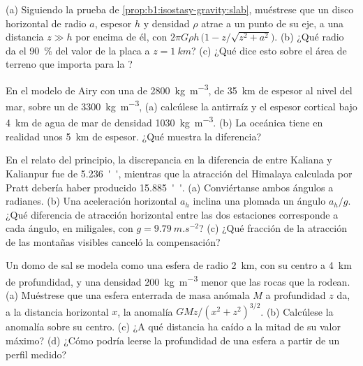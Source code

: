 \begin{exercise}[$\star\star$]\label{exo:b1:isostasy-gravity:7}
(a) Siguiendo la prueba de \cref{prop:b1:isostasy-gravity:slab}, muéstrese que un disco horizontal de radio $a$, espesor $h$ y
densidad $\rho$ atrae a un punto de su eje, a una distancia $z \gg h$ por encima de él, con $2\pi G\rho h\,\bigl(1 -
z/\sqrt{z^2 + a^2}\bigr)$. (b) ¿Qué radio da el \qty{90}{\percent} del valor de la placa a $z = \qty{1}{km}$? (c) ¿Qué dice esto
sobre el área de terreno que importa para la ?
\end{exercise}

\begin{exercise}[$\star\star$]\label{exo:b1:isostasy-gravity:8}
En el modelo de Airy con una  de \qty{2800}{kg.m^{-3}}, de \qty{35}{km} de espesor al nivel del mar, sobre un  de
\qty{3300}{kg.m^{-3}}, (a) calcúlese la antirraíz y el espesor cortical bajo \qty{4}{km} de agua de mar de densidad
\qty{1030}{kg.m^{-3}}. (b) La  oceánica tiene en realidad unos \qty{5}{km} de espesor. ¿Qué muestra la diferencia?
\end{exercise}

\begin{exercise}[$\star\star$]\label{exo:b1:isostasy-gravity:9}
En el relato del principio, la discrepancia en la diferencia de  entre Kaliana y Kalianpur fue de \qty{5.236}{''}, mientras
que la atracción del Himalaya calculada por Pratt debería haber producido \qty{15.885}{''}. (a) Conviértanse ambos ángulos a
radianes. (b) Una aceleración horizontal $a_h$ inclina una plomada un ángulo $a_h/g$. ¿Qué diferencia de atracción horizontal entre
las dos estaciones corresponde a cada ángulo, en miligales, con $g = \qty{9.79}{m.s^{-2}}$? (c) ¿Qué fracción de la atracción de las
montañas visibles canceló la compensación?
\end{exercise}

\begin{exercise}[$\star\star\star$]\label{exo:b1:isostasy-gravity:10}
Un domo de sal se modela como una esfera de radio \qty{2}{km}, con su centro a \qty{4}{km} de profundidad, y una densidad
\qty{200}{kg.m^{-3}} menor que las rocas que la rodean. (a) Muéstrese que una esfera enterrada de masa anómala $M$ a profundidad $z$
da, a la distancia horizontal $x$, la anomalía $GMz/(x^2 + z^2)^{3/2}$. (b) Calcúlese la anomalía sobre su centro. (c) ¿A qué
distancia ha caído a la mitad de su valor máximo? (d) ¿Cómo podría leerse la profundidad de una esfera a partir de un perfil medido?
\end{exercise}

